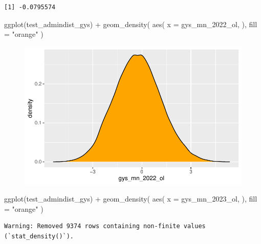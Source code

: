 \documentclass[
  letterpaper,
  DIV=11,
  numbers=noendperiod]{scrartcl}
\newenvironment{Shaded}{\begin{snugshade}}{\end{snugshade}}
\newcommand{\AttributeTok}[1]{\textcolor[rgb]{0.40,0.45,0.13}{#1}}
\newcommand{\FunctionTok}[1]{\textcolor[rgb]{0.28,0.35,0.67}{#1}}
\newcommand{\NormalTok}[1]{\textcolor[rgb]{0.00,0.23,0.31}{#1}}
\newcommand{\SpecialCharTok}[1]{\textcolor[rgb]{0.37,0.37,0.37}{#1}}
\newcommand{\StringTok}[1]{\textcolor[rgb]{0.13,0.47,0.30}{#1}}
\begin{document}
\begin{verbatim}
[1] -0.0795574
\end{verbatim}

\begin{Shaded}
\begin{Highlighting}[]
\FunctionTok{ggplot}\NormalTok{(test\_admindist\_gys) }\SpecialCharTok{+}
  \FunctionTok{geom\_density}\NormalTok{(}
    \FunctionTok{aes}\NormalTok{(}
      \AttributeTok{x =}\NormalTok{ gys\_mn\_2022\_ol,}
\NormalTok{      ),}
    \AttributeTok{fill =} \StringTok{"orange"}
\NormalTok{  )}
\end{Highlighting}
\end{Shaded}

\begin{figure}[H]

{\centering \includegraphics{GeospatialMapping_files/figure-pdf/district-scores-density-1.pdf}

}

\end{figure}

\begin{Shaded}
\begin{Highlighting}[]
\FunctionTok{ggplot}\NormalTok{(test\_admindist\_gys) }\SpecialCharTok{+}
  \FunctionTok{geom\_density}\NormalTok{(}
    \FunctionTok{aes}\NormalTok{(}
      \AttributeTok{x =}\NormalTok{ gys\_mn\_2023\_ol,}
\NormalTok{      ),}
    \AttributeTok{fill =} \StringTok{"orange"}
\NormalTok{  )}
\end{Highlighting}
\end{Shaded}

\begin{verbatim}
Warning: Removed 9374 rows containing non-finite values (`stat_density()`).
\end{verbatim}
\end{document}
